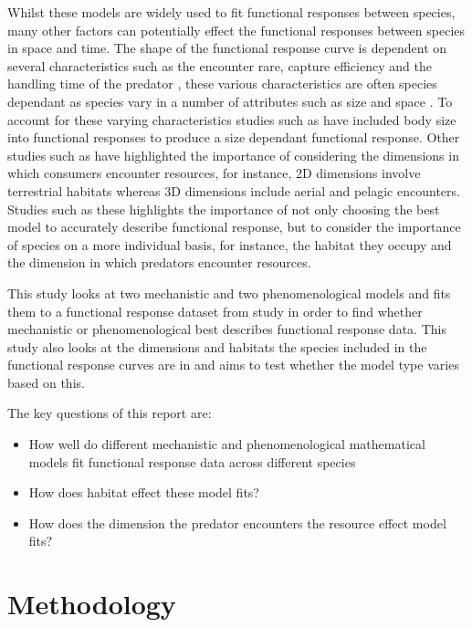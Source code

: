 \documentclass[11pt]{article}
\begin{document}
Whilst these models are widely used to fit functional responses between species, many other factors can potentially effect the functional responses between species in space and time. The shape of the functional response curve is dependent on several characteristics such as the encounter rare, capture efficiency and the handling time of the predator \cite{Holling1965}, these various characteristics are often species dependant as species vary in a number of attributes such as size and space \cite{Elliott2003}. To account for these varying characteristics studies such as \cite{Aljetlawi2004}  have included body size into functional responses to produce a size dependant functional response. Other studies such as \cite{Pawar2012} have highlighted the importance of considering the dimensions in which consumers encounter resources, for instance, 2D dimensions involve terrestrial habitats whereas 3D dimensions include aerial and pelagic encounters. Studies such as these highlights the importance of not only choosing the best model to accurately describe functional response, but to consider the importance of species on a more individual basis, for instance, the habitat they occupy and the dimension in which predators encounter resources. 

This study looks at two mechanistic and two phenomenological models and fits them to a functional response dataset from \cite{Pawar2012} study in order to find whether mechanistic or phenomenological best describes functional response data. This study also looks at the dimensions and habitats the species included in the functional response curves are in and aims to test whether the model type varies based on this.

The key questions of this report are:
	\begin{itemize}
	\item How well do different mechanistic and phenomenological mathematical models fit functional response data across different species
	\item How does habitat effect these model fits? 
	\item How does the dimension the predator encounters the resource effect model fits? 
	\end{itemize}
\newpage

	\section{Methodology}
\noindent
\end{document}
